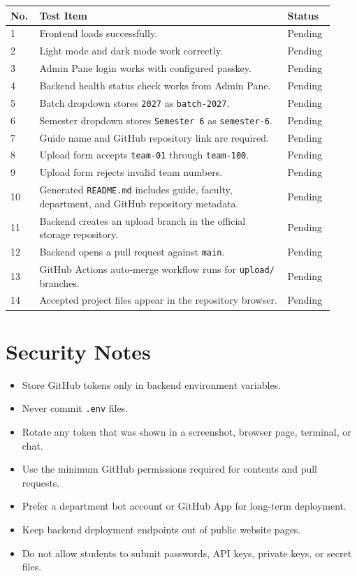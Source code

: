\documentclass[12pt,a4paper]{article}
\begin{document}
\begin{longtable}{p{0.08\linewidth} p{0.72\linewidth} p{0.12\linewidth}}
\toprule
\textbf{No.} & \textbf{Test Item} & \textbf{Status} \\
\midrule
1 & Frontend loads successfully. & Pending \\
2 & Light mode and dark mode work correctly. & Pending \\
3 & Admin Pane login works with configured passkey. & Pending \\
4 & Backend health status check works from Admin Pane. & Pending \\
5 & Batch dropdown stores \texttt{2027} as \texttt{batch-2027}. & Pending \\
6 & Semester dropdown stores \texttt{Semester 6} as \texttt{semester-6}. & Pending \\
7 & Guide name and GitHub repository link are required. & Pending \\
8 & Upload form accepts \texttt{team-01} through \texttt{team-100}. & Pending \\
9 & Upload form rejects invalid team numbers. & Pending \\
10 & Generated \texttt{README.md} includes guide, faculty, department, and GitHub repository metadata. & Pending \\
11 & Backend creates an upload branch in the official storage repository. & Pending \\
12 & Backend opens a pull request against \texttt{main}. & Pending \\
13 & GitHub Actions auto-merge workflow runs for \texttt{upload/} branches. & Pending \\
14 & Accepted project files appear in the repository browser. & Pending \\
\bottomrule
\end{longtable}

\section{Security Notes}

\begin{itemize}[leftmargin=*]
    \item Store GitHub tokens only in backend environment variables.
    \item Never commit \texttt{.env} files.
    \item Rotate any token that was shown in a screenshot, browser page, terminal, or chat.
    \item Use the minimum GitHub permissions required for contents and pull requests.
    \item Prefer a department bot account or GitHub App for long-term deployment.
    \item Keep backend deployment endpoints out of public website pages.
    \item Do not allow students to submit passwords, API keys, private keys, or secret files.
\end{itemize}
\end{document}
